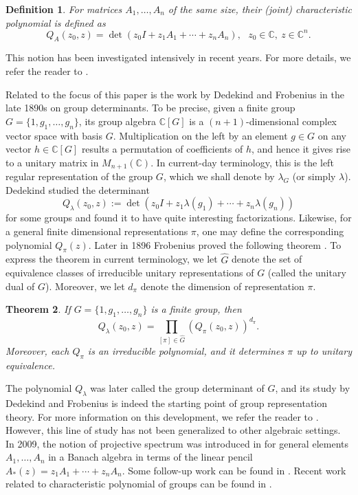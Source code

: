 \documentclass[draft, 12pt, reqno]{amsart}
\newcommand{\C}{{\mathbb C}}
\numberwithin{equation}{section}
\theoremstyle{plain}
\newtheorem{theorem}{Theorem}[section]
\newtheorem{definition}[theorem]{Definition}
\begin{document}
\begin{definition}
For matrices $A_1,\dots,A_n$ of the same size, their (joint) characteristic polynomial is defined as \[Q_A(z_0, z)=\det (z_0I+z_1A_1+\cdots +z_nA_n),\ \ \ z_0\in \C,\ z\in \C^n. \]
\end{definition}

This notion has been investigated intensively in recent years. For more details, we refer the reader to \cite{Ya24}. 

Related to the focus of this paper is the work by Dedekind and Frobenius in the late 1890s on group determinants. To be precise, given a finite group $G=\{1, g_1,\dots,g_n\}$, its group algebra $\C[G]$ is a $(n+1)$-dimensional complex vector space with basis $G$. Multiplication on the left by an element $g\in G$ on any vector $h\in \C[G]$ results a permutation of coefficients of $h$, and hence it gives rise to a unitary matrix in $M_{n+1}(\C)$. In current-day terminology, this is the left regular representation of the group $G$, which we shall denote by $\lambda_G$ (or simply $\lambda$). Dedekind studied the determinant 
\[Q_{\lambda}(z_0,z):=\det (z_0I+z_1\lambda(g_1)+\cdots +z_n\lambda(g_n))\]
for some groups and found it to have quite interesting factorizations. Likewise, for a general finite dimensional representations $\pi$, one may define the corresponding polynomial $Q_{\pi}(z)$. Later in 1896 Frobenius proved the following theorem \cite{De, Fr}. To express the theorem in current terminology, we let $\hat{G}$ denote the set of equivalence classes of irreducible unitary representations of $G$ (called the unitary dual of $G$). Moreover, we let $d_\pi$ denote the dimension of representation $\pi$.
\begin{theorem}\label{Frob} 
If $G=\{1, g_1,\dots,g_n\}$ is a finite group, then
\[Q_{\lambda}(z_0,z)=\prod_{[\pi]\in \hat{G}}(Q_{\pi}(z_0,z))^{d_\pi}.\]
 Moreover, each $Q_\pi$ is an irreducible polynomial, and it determines $\pi$ up to unitary equivalence.
\end{theorem}

The polynomial $Q_{\lambda}$ was later called the group determinant of $G$, and its study by Dedekind and Frobenius is indeed the starting point of group representation theory. For more information on this development, we refer the reader to \cite{Cu,Cu2, Di21, Di75, FS}. However, this line of study has not been generalized to other algebraic settings. In 2009, the notion of projective spectrum was introduced in \cite{Ya09} for general elements $A_1,\dots,A_n$ in a Banach algebra in terms of the linear pencil $A_*(z)=z_1A_1+\cdots +z_nA_n$. Some follow-up work can be found in \cite{BCY,CY,CSZ,DY,GOY,GY,HWY,MQW17,S,S4,S3,SYZ}. Recent work related to characteristic polynomial of groups can be found in \cite{CST, HY18}. 
\end{document}
